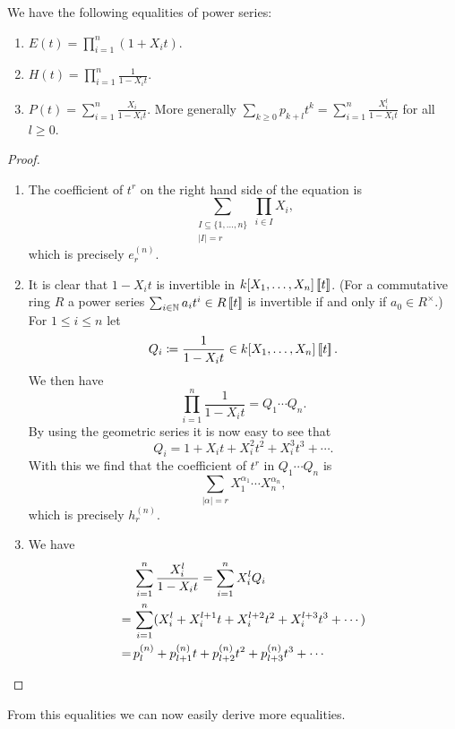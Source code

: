 \begin{prop}
 We have the following equalities of power series:
 \begin{enumerate}[label=\emph{\alph*)},leftmargin=*]
  \item
   $E(t) = \prod_{i=1}^n (1 + X_i t)$.
  \item
   $H(t) = \prod_{i=1}^n \frac{1}{1 - X_i t}$.
  \item
   $P(t) = \sum_{i=1}^n \frac{X_i}{1 - X_i t}$. More generally $\sum_{k \geq 0} p_{k+l} t^k = \sum_{i=1}^n \frac{X_i^l}{1 - X_i t}$ for all $l \geq 0$.
 \end{enumerate}
\end{prop}
\begin{proof}
 \begin{enumerate}[label=\emph{\alph*)},leftmargin=*]
  \item
   The coefficient of $t^r$ on the right hand side of the equation is
   \[
    \sum_{\substack{I \subseteq \{1, \dotsc, n\} \\ |I| = r}} \prod_{i \in I} X_i,
   \]
   which is precisely $e^{(n)}_r$.
  \item
   It is clear that $1-X_i t$ is invertible in $k[X_1, \dotsc, X_n]\left[\!\left[t\right]\!\right]$. (For a commutative ring $R$ a power series $\sum_{i \in \mathbb{N}} a_i t^i \in R\left[\!\left[t\right]\!\right]$ is invertible if and only if $a_0 \in R^\times$.) For $1 \leq i \leq n$ let
   \[
    Q_i \coloneqq \frac{1}{1-X_i t} \in k[X_1, \dotsc, X_n] \left[\!\left[t\right]\!\right].
   \]
   We then have
   \[
    \prod_{i=1}^n \frac{1}{1-X_i t} = Q_1 \dotsm Q_n.
   \]
   By using the geometric series it is now easy to see that
   \[
    Q_i = 1 + X_i t + X_i^2 t^2 + X_i^3 t^3 + \dotsb.
   \]
   With this we find that the coefficient of $t^r$ in $Q_1 \dotsm Q_n$ is
   \[
    \sum_{|\alpha| = r} X_1^{\alpha_1} \dotsm X_n^{\alpha_n},
   \]
   which is precisely $h^{(n)}_r$.
  \item
   We have
   \begin{align*}
     &\, \sum_{i=1}^n \frac{X_i^l}{1-X_i t}
    =    \sum_{i=1}^n X_i^l Q_i \\
    =&\, \sum_{i=1}^n (X_i^l + X_i^{l+1} t + X_i^{l+2} t^2 + X_i^{l+3} t^3 + \dotsb) \\
    =&\, p^{(n)}_l + p^{(n)}_{l+1} t + p^{(n)}_{l+2} t^2 + p^{(n)}_{l+3} t^3 + \dotsb
    \qedhere
   \end{align*}
 \end{enumerate}
\end{proof}


From this equalities we can now easily derive more equalities.


